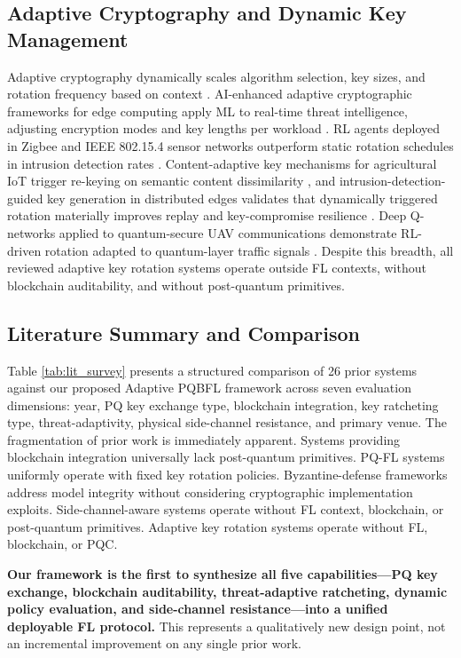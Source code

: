 \documentclass[journal, 10pt, twocolumn]{IEEEtran}
\begin{document}
\subsection{Adaptive Cryptography and Dynamic Key Management}
Adaptive cryptography dynamically scales algorithm selection, key sizes, and rotation frequency based on context \cite{adaptive_iot}. AI-enhanced adaptive cryptographic frameworks for edge computing apply ML to real-time threat intelligence, adjusting encryption modes and key lengths per workload \cite{threat_adaptive}. RL agents deployed in Zigbee and IEEE 802.15.4 sensor networks outperform static rotation schedules in intrusion detection rates \cite{rl_rotation1}. Content-adaptive key mechanisms for agricultural IoT trigger re-keying on semantic content dissimilarity \cite{rl_rotation2}, and intrusion-detection-guided key generation in distributed edges validates that dynamically triggered rotation materially improves replay and key-compromise resilience \cite{rl_rotation3}. Deep Q-networks applied to quantum-secure UAV communications demonstrate RL-driven rotation adapted to quantum-layer traffic signals \cite{qfl_uav}. Despite this breadth, all reviewed adaptive key rotation systems operate outside FL contexts, without blockchain auditability, and without post-quantum primitives.

\subsection{Literature Summary and Comparison}
\label{subsec:lit_comparison}

Table \ref{tab:lit_survey} presents a structured comparison of 26 prior systems against our proposed Adaptive PQBFL framework across seven evaluation dimensions: year, PQ key exchange type, blockchain integration, key ratcheting type, threat-adaptivity, physical side-channel resistance, and primary venue. The fragmentation of prior work is immediately apparent. Systems providing blockchain integration universally lack post-quantum primitives. PQ-FL systems uniformly operate with fixed key rotation policies. Byzantine-defense frameworks address model integrity without considering cryptographic implementation exploits. Side-channel-aware systems operate without FL context, blockchain, or post-quantum primitives. Adaptive key rotation systems operate without FL, blockchain, or PQC.

\textbf{Our framework is the first to synthesize all five capabilities---PQ key exchange, blockchain auditability, threat-adaptive ratcheting, dynamic policy evaluation, and side-channel resistance---into a unified deployable FL protocol.} This represents a qualitatively new design point, not an incremental improvement on any single prior work.
\end{document}
